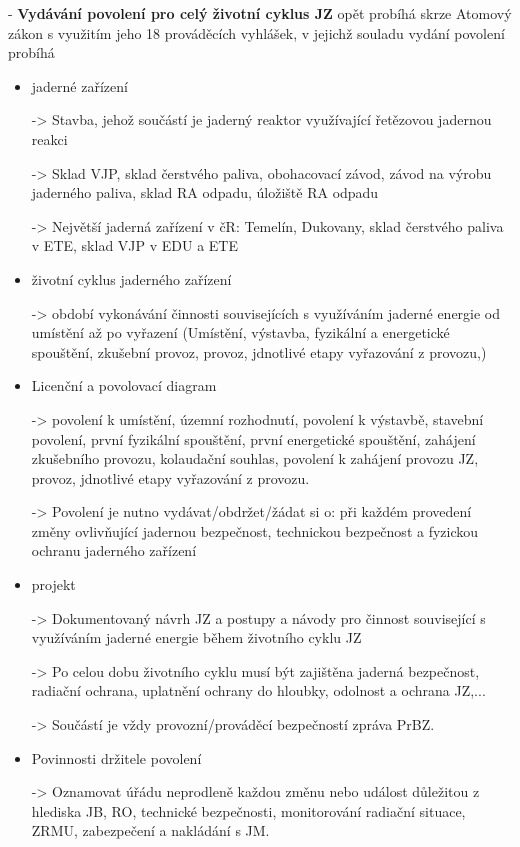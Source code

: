 \noindent- \textbf{Vydávání povolení pro celý životní cyklus JZ} opět probíhá skrze Atomový zákon s využitím jeho 18 prováděcích vyhlášek, v jejichž souladu vydání povolení probíhá
\begin{itemize}
	\item jaderné zařízení
	
	-> Stavba, jehož součástí je jaderný reaktor využívající řetězovou jadernou reakci
	
	-> Sklad VJP, sklad čerstvého paliva, obohacovací závod, závod na výrobu jaderného paliva, sklad RA odpadu, úložiště RA odpadu
	
	-> Největší jaderná zařízení v čR: Temelín, Dukovany, sklad čerstvého paliva v ETE, sklad VJP v EDU a ETE
	

	\item životní cyklus jaderného zařízení
	
	-> období vykonávání činnosti souvisejících s využíváním jaderné energie od umístění až po vyřazení (Umístění, výstavba, fyzikální a energetické spouštění, zkušební provoz, provoz, jdnotlivé etapy vyřazování z provozu,)

        
	\item Licenční a povolovací diagram 
	
	-> povolení k umístění, územní rozhodnutí, povolení k výstavbě, stavební povolení, první fyzikální spouštění, první energetické spouštění, zahájení zkušebního provozu, kolaudační souhlas, povolení k zahájení provozu JZ, provoz, jdnotlivé etapy vyřazování z provozu. 

        -> Povolení je nutno vydávat/obdržet/žádat si o: při každém provedení změny ovlivňující jadernou bezpečnost, technickou bezpečnost a fyzickou ochranu jaderného zařízení
	\item projekt
	
	-> Dokumentovaný návrh JZ a postupy a návody pro činnost související s využíváním jaderné energie během životního cyklu JZ
	
	-> Po celou dobu životního cyklu musí být zajištěna jaderná bezpečnost, radiační ochrana, uplatnění ochrany do hloubky, odolnost a ochrana JZ,...

        -> Součástí je vždy provozní/prováděcí bezpečností zpráva PrBZ.

        \item Povinnosti držitele povolení

        -> Oznamovat úřádu neprodleně každou změnu nebo událost důležitou z hlediska JB, RO, technické bezpečnosti, monitorování radiační situace, ZRMU, zabezpečení a nakládání s JM.


\end{itemize}
